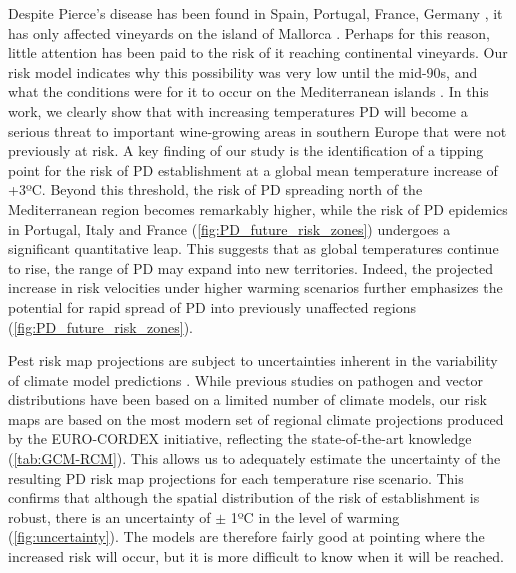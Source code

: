 Despite Pierce's disease has been found in Spain, Portugal, France, Germany
\cite{Bragard2019}, it has only affected vineyards on the island of Mallorca
\cite{Moralejo2019}. Perhaps for this reason,
little attention has been paid to the risk of it reaching continental
vineyards. Our risk model indicates why this possibility was very low until the
mid-90s, and what the conditions were for it to occur on the Mediterranean
islands \cite{GimenezRomero2022_CommsBio}.  In this work,
we clearly show that  with increasing temperatures PD will become a serious
threat to important wine-growing areas in southern Europe that were not
previously at risk. A key finding of our study is the identification of a
tipping point for the risk of PD establishment at a global mean temperature
increase of +3ºC. Beyond this threshold, the risk of PD spreading north of the
Mediterranean region becomes remarkably higher, while the risk of PD epidemics
in Portugal, Italy and France (\cref{fig:PD_future_risk_zones}) undergoes a
significant quantitative leap. This suggests that as global temperatures
continue to rise, the range of PD may expand into new territories. Indeed, the
projected increase in risk velocities under higher warming scenarios further
emphasizes the potential for rapid spread of PD into previously unaffected
regions (\cref{fig:PD_future_risk_zones}).

Pest risk map projections are subject to uncertainties inherent in the
variability of climate model predictions \cite{venette2010pest}. While previous
studies on pathogen and vector distributions have been based on a limited
number of climate models, our risk maps are based on the most modern set of
regional climate projections produced by the EURO-CORDEX initiative, reflecting
the state-of-the-art knowledge (\cref{tab:GCM-RCM}). This allows us to
adequately estimate the uncertainty of the resulting PD risk map projections
for each temperature rise scenario. This confirms that although the spatial
distribution of the risk of establishment is robust, there is an uncertainty of
$\pm$ 1ºC in the level of warming (\cref{fig:uncertainty}). The models are
therefore fairly good at  pointing  where the increased risk will occur, but it
is more difficult to know when it will be reached.


